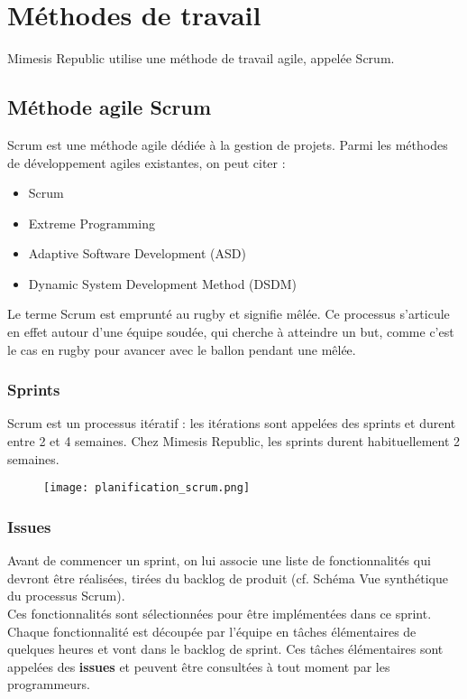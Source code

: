\chapter{Méthodes de travail}
Mimesis Republic utilise une méthode de travail agile, appelée Scrum.
\section{Méthode agile Scrum}
Scrum est une méthode agile dédiée à la gestion de projets.
Parmi les méthodes de développement agiles existantes, on peut citer :
\begin{itemize}
\item Scrum
\item Extreme Programming
\item Adaptive Software Development (ASD)
\item Dynamic System Development Method (DSDM)\\
\end{itemize}
Le terme Scrum est emprunté au rugby et signifie mêlée. Ce processus
s'articule en effet autour d'une équipe soudée, qui cherche à atteindre un but,
comme c'est le cas en rugby pour avancer avec le ballon pendant une mêlée.\\
\subsection{Sprints}
Scrum est un processus itératif : les itérations sont appelées des sprints et
durent entre 2 et 4 semaines.
Chez Mimesis Republic, les sprints durent habituellement 2 semaines.
\begin{figure}[H]
  \begin{center}
    \texttt{[image: planification\_scrum.png]}
  \end{center}
\end{figure}

\clearpage
\subsection{Issues}
Avant de commencer un sprint, on lui associe une liste de fonctionnalités qui
devront être réalisées, tirées du backlog de produit (cf. Schéma Vue synthétique
du processus Scrum).\\
Ces fonctionnalités sont sélectionnées pour être implémentées dans ce sprint.\\

Chaque fonctionnalité est découpée par l'équipe en tâches élémentaires de
quelques heures et vont dans le backlog de sprint. Ces tâches élémentaires sont
appelées des \textbf{issues} et peuvent être consultées à tout moment par les
programmeurs.\\


